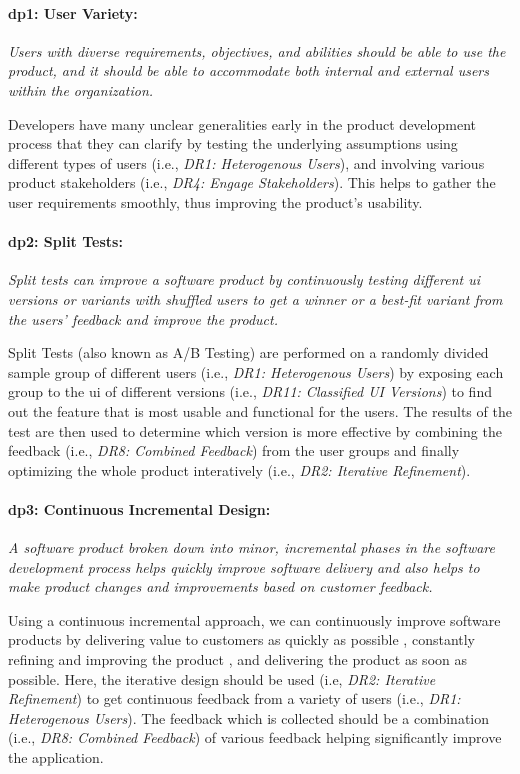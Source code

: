 \paragraph{\ac{dp}1: User Variety:} \textit{Users with diverse requirements, objectives, and abilities should be able to use the product, and it should be able to accommodate both internal and external users within the organization.}

Developers have many unclear generalities early in the product development process \cite{misc:lean:steve} that they can clarify by testing the underlying assumptions using different types of users (i.e., \textit{DR1: Heterogenous Users}), and involving various product stakeholders (i.e., \textit{DR4: Engage Stakeholders}).
This helps to gather the user requirements smoothly, thus improving the product's usability.

\paragraph{\ac{dp}2: Split Tests:} \textit{Split tests can improve a software product by continuously testing different \ac{ui} versions or variants with shuffled users to get a winner or a best-fit variant from the users' feedback and improve the product.}

Split Tests (also known as A/B Testing) are performed on a randomly divided sample group of different users (i.e., \textit{DR1: Heterogenous Users}) by exposing each group to the \ac{ui} of different versions (i.e., \textit{DR11: Classified UI Versions}) to find out the feature that is most usable and functional for the users.
The results of the test are then used to determine which version is more effective by combining the feedback (i.e., \textit{DR8: Combined Feedback}) from the user groups and finally optimizing the whole product interatively (i.e., \textit{DR2: Iterative Refinement}).

\paragraph{\ac{dp}3: Continuous Incremental Design:} \textit{A software product broken down into minor, incremental phases in the software development process helps quickly improve software delivery and also helps to make product changes and improvements based on customer feedback.}

Using a continuous incremental approach, we can continuously improve software products by delivering value to customers as quickly as possible \cite{misc:lean:toyota}, constantly refining and improving the product \cite{misc:lean:planning}, and delivering the product as soon as possible.
Here, the iterative design should be used (i.e, \textit{DR2: Iterative Refinement}) to get continuous feedback from a variety of users (i.e., \textit{DR1: Heterogenous Users}).
The feedback which is collected should be a combination (i.e., \textit{DR8: Combined Feedback}) of various feedback helping significantly improve the application.

